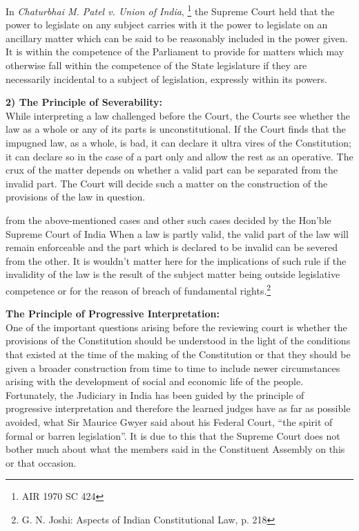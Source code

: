 \begin{multicols}{2}
\noi
In \textit{Chaturbhai M. Patel v. Union of India}, \footnote{ AIR 1970 SC 424}
the Supreme Court held that the power to
legislate on any subject carries with it the power to legislate on an ancillary matter
which can be said to be reasonably included in the power given. It is within the
competence of the Parliament to provide for matters which may otherwise fall within the competence of the State legislature if they are necessarily incidental to a subject of
legislation, expressly within its powers.

\noi
{\bf 2) The Principle of Severability:}\\[.2cm] While interpreting a law challenged before the Court, the Courts see whether the law
as a whole or any of its parts is unconstitutional. If the Court finds that the impugned
law, as a whole, is bad, it can declare it ultra vires of the Constitution; it can declare so
in the case of a part only and allow the rest as an operative. The crux of the matter
depends on whether a valid part can be separated from the invalid part. The Court will
decide such a matter on the construction of the provisions of the law in question.

\noi
from the above-mentioned cases and other such cases decided by the Hon’ble Supreme
Court of India When a law is partly valid, the valid part of the law will remain
enforceable and the part which is declared to be invalid can be severed from the other.
It is wouldn’t matter here for the implications of such rule if the invalidity of the law is
the result of the subject matter being outside legislative competence or for the reason
of breach of fundamental rights.\footnote{G. N. Joshi: Aspects of Indian Constitutional Law, p. 218}

\noi
{\bf The Principle of Progressive Interpretation: }\\[0.2cm] One of the important questions arising before the reviewing court is whether the
provisions of the Constitution should be understood in the light of the conditions that
existed at the time of the making of the Constitution or that they should be given a
broader construction from time to time to include newer circumstances arising with the
development of social and economic life of the people. Fortunately, the Judiciary in
India has been guided by the principle of progressive interpretation and therefore the
learned judges have as far as possible avoided, what Sir Maurice Gwyer said about his
Federal Court, “the spirit of formal or barren legislation”. It is due to this that the
Supreme Court does not bother much about what the members said in the Constituent
Assembly on this or that occasion. 


\end{multicols}
